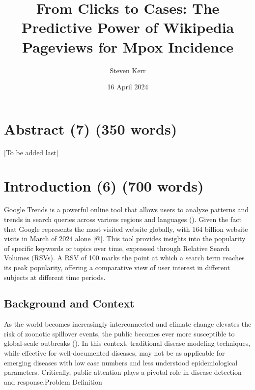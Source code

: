 \documentclass[
  12pt,
]{article}
\title{From Clicks to Cases: The Predictive Power of Wikipedia Pageviews
for Mpox Incidence}
\author{Steven Kerr}
\date{16 April 2024}
\renewcommand*\contentsname{Table of contents}
\newcommand\contentsname{Table of contents}
\begin{document}
\maketitle

\renewcommand*\contentsname{Table of contents}
{
\hypersetup{linkcolor=}
\setcounter{tocdepth}{3}
\tableofcontents
}
\section{Abstract (7) (350 words)}\label{abstract-7-350-words}

{[}To be added last{]}

\section{Introduction (6) (700 words)}\label{introduction-6-700-words}

Google Trends is a powerful online tool that allows users to analyze
patterns and trends in search queries across various regions and
languages ().
Given the fact that Google represents the most visited website globally,
with 164 billion website visits in March of 2024 alone {[}@{]}. This
tool provides insights into the popularity of specific keywords or
topics over time, expressed through Relative Search Volumes (RSVs). A
RSV of 100 marks the point at which a search term reaches its peak
popularity, offering a comparative view of user interest in different
subjects at different time periods.

\subsection{Background and Context}\label{background-and-context}

As the world becomes increasingly interconnected and climate change
elevates the risk of zoonotic spillover events, the public becomes ever
more susceptible to global-scale outbreaks
(). In this context,
traditional disease modeling techniques, while effective for
well-documented diseases, may not be as applicable for emerging diseases
with low case numbers and less understood epidemiological parameters.
Critically, public attention plays a pivotal role in disease detection
and response.Problem Definition
\end{document}

